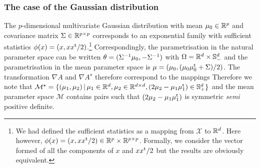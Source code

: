 \subsubsection*{The case of the Gaussian distribution}
The $p$-dimensional multivariate Gaussian distribution with mean $\mu_0\in\mathbb R^{p}$ and covariance matrix $\Sigma\in\mathbb R^{p\times p}$ corresponds to an exponential family with sufficient statistics $\phi(x) = (x,xx^\mathrm{t}/2)$.\footnote{We had defined the sufficient statistics as a mapping from $\mathcal X$ to $\mathbb R^{d}$. Here however, $\phi(x)=(x,xx^\mathrm{t}/2)\in\mathbb R^{p}\times \mathbb R^{p\times p}$. Formally, we consider the vector formed of all the components of $x$ and $xx^\mathrm{t}/2$ but the results are obviously equivalent.} Correspondingly, the parametrisation in the natural parameter space can be written $\theta=(\Sigma^{-1} \mu_0, -\Sigma^{-1})$ with $\Omega = \mathbb R^{d}\times \mathbb S_-^{d}$ and the parametrisation in the mean parameter space is $\mu=(\mu_0,(\mu_0\mu_0^\mathrm{t}+\Sigma)/2)$. The transformation $\nabla A$ and $\nabla A^{\star}$ therefore correspond to the mappings
%
%
Therefore we note that $\mathcal M^{\star} = \{(\mu_1,\mu_2)\,|\, \mu_1\in\mathbb R^{d}, \mu_2\in\mathbb R^{d\times d}, (2\mu_2-\mu_1\mu_1^\mathrm{t})\in\mathbb S_+^{d}\}$ and the mean parameter space $\mathcal M$ contains pairs such that $(2\mu_2-\mu_1\mu_1^\mathrm{t})$ is symmetric \emph{semi} positive definite.

